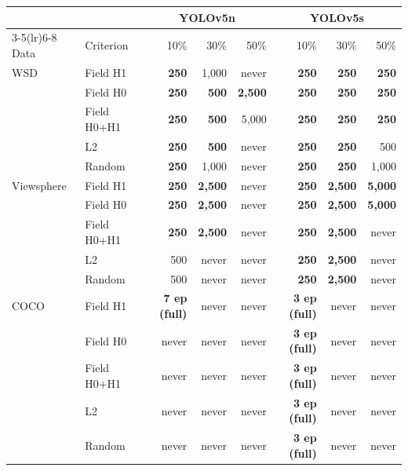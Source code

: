 \begin{tabular}{llrrrrrr}
\toprule
 & & \multicolumn{3}{c}{YOLOv5n} & \multicolumn{3}{c}{YOLOv5s} \\
\cmidrule(lr){3-5}\cmidrule(lr){6-8}
Data & Criterion & 10\% & 30\% & 50\% & 10\% & 30\% & 50\% \\
\midrule
WSD & Field H1 & \textbf{250} & 1,000 & never & \textbf{250} & \textbf{250} & \textbf{250} \\
 & Field H0 & \textbf{250} & \textbf{500} & \textbf{2,500} & \textbf{250} & \textbf{250} & \textbf{250} \\
 & Field H0+H1 & \textbf{250} & \textbf{500} & 5,000 & \textbf{250} & \textbf{250} & \textbf{250} \\
 & L2 & \textbf{250} & \textbf{500} & never & \textbf{250} & \textbf{250} & 500 \\
 & Random & \textbf{250} & 1,000 & never & \textbf{250} & \textbf{250} & 1,000 \\
\midrule
Viewsphere & Field H1 & \textbf{250} & \textbf{2,500} & never & \textbf{250} & \textbf{2,500} & \textbf{5,000} \\
 & Field H0 & \textbf{250} & \textbf{2,500} & never & \textbf{250} & \textbf{2,500} & \textbf{5,000} \\
 & Field H0+H1 & \textbf{250} & \textbf{2,500} & never & \textbf{250} & \textbf{2,500} & never \\
 & L2 & 500 & never & never & \textbf{250} & \textbf{2,500} & never \\
 & Random & 500 & never & never & \textbf{250} & \textbf{2,500} & never \\
\midrule
COCO & Field H1 & \textbf{7 ep (full)} & never & never & \textbf{3 ep (full)} & never & never \\
 & Field H0 & never & never & never & \textbf{3 ep (full)} & never & never \\
 & Field H0+H1 & never & never & never & \textbf{3 ep (full)} & never & never \\
 & L2 & never & never & never & \textbf{3 ep (full)} & never & never \\
 & Random & never & never & never & \textbf{3 ep (full)} & never & never \\
\bottomrule
\end{tabular}
